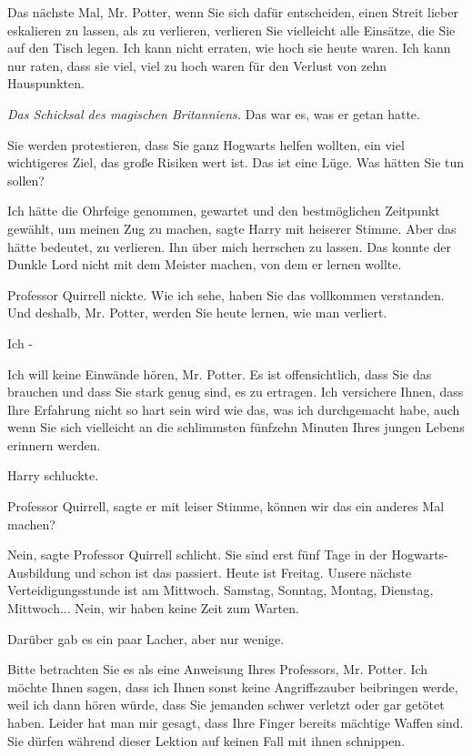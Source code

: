 \glqq{}Das nächste Mal, Mr. Potter, wenn Sie sich dafür entscheiden, einen Streit
lieber eskalieren zu lassen, als zu verlieren, verlieren Sie vielleicht alle
Einsätze, die Sie auf den Tisch legen. Ich kann nicht erraten, wie hoch sie
heute waren. Ich kann nur raten, dass sie viel, viel zu hoch waren für den
Verlust von zehn Hauspunkten.\grqq{}

\emph{Das Schicksal des magischen Britanniens.}
Das war es, was er getan hatte.

\glqq{}Sie werden protestieren, dass Sie ganz Hogwarts helfen wollten, ein viel
wichtigeres Ziel, das große Risiken wert ist. Das ist eine Lüge. Was hätten Sie
tun sollen?\grqq{}

\glqq{}Ich hätte die Ohrfeige genommen, gewartet und den bestmöglichen Zeitpunkt
gewählt, um meinen Zug zu machen\grqq{}, sagte Harry mit heiserer Stimme. \glqq
Aber das hätte bedeutet, zu verlieren. Ihn über mich herrschen zu lassen. Das
konnte der Dunkle Lord nicht mit dem Meister machen, von dem er lernen
wollte.\grqq{}

Professor Quirrell nickte. \glqq{}Wie ich sehe, haben Sie das vollkommen
verstanden. Und deshalb, Mr. Potter, werden Sie heute lernen, wie man
verliert.\grqq{}

\glqq{}Ich -\grqq{}

\glqq{}Ich will keine Einwände hören, Mr. Potter. Es ist offensichtlich, dass Sie
das brauchen und dass Sie stark genug sind, es zu ertragen. Ich versichere
Ihnen, dass Ihre Erfahrung nicht so hart sein wird wie das, was ich durchgemacht
habe, auch wenn Sie sich vielleicht an die schlimmsten fünfzehn Minuten Ihres
jungen Lebens erinnern werden.\grqq{}

Harry schluckte.

\glqq{}Professor Quirrell\grqq{}, sagte er mit leiser Stimme, \glqq{}können wir
das ein anderes Mal machen?\grqq{}

\glqq{}Nein\grqq{}, sagte Professor Quirrell schlicht. \glqq{}Sie sind erst fünf
Tage in der Hogwarts-Ausbildung und schon ist das passiert. Heute ist Freitag.
Unsere nächste Verteidigungsstunde ist am Mittwoch. Samstag, Sonntag, Montag,
Dienstag, Mittwoch... Nein, wir haben keine Zeit zum Warten.\grqq{}

Darüber gab es ein paar Lacher, aber nur wenige.

\glqq{}Bitte betrachten Sie es als eine Anweisung Ihres Professors, Mr. Potter.
Ich möchte Ihnen sagen, dass ich Ihnen sonst keine Angriffszauber beibringen
werde, weil ich dann hören würde, dass Sie jemanden schwer verletzt oder gar
getötet haben. Leider hat man mir gesagt, dass Ihre Finger bereits mächtige
Waffen sind. Sie dürfen während dieser Lektion auf keinen Fall mit ihnen
schnippen.\grqq{}

